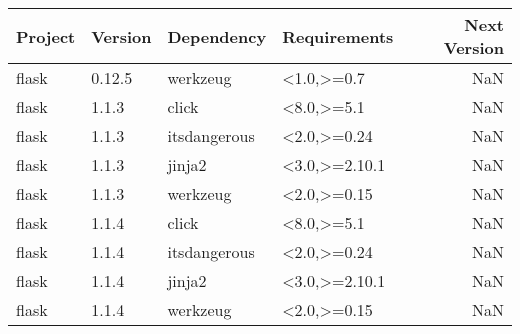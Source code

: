 \begin{tabular}{llllr}
\toprule
Project & Version & Dependency & Requirements & Next Version \\
\midrule
flask & 0.12.5 & werkzeug & <1.0,>=0.7 & NaN \\
flask & 1.1.3 & click & <8.0,>=5.1 & NaN \\
flask & 1.1.3 & itsdangerous & <2.0,>=0.24 & NaN \\
flask & 1.1.3 & jinja2 & <3.0,>=2.10.1 & NaN \\
flask & 1.1.3 & werkzeug & <2.0,>=0.15 & NaN \\
flask & 1.1.4 & click & <8.0,>=5.1 & NaN \\
flask & 1.1.4 & itsdangerous & <2.0,>=0.24 & NaN \\
flask & 1.1.4 & jinja2 & <3.0,>=2.10.1 & NaN \\
flask & 1.1.4 & werkzeug & <2.0,>=0.15 & NaN \\
\bottomrule
\end{tabular}
